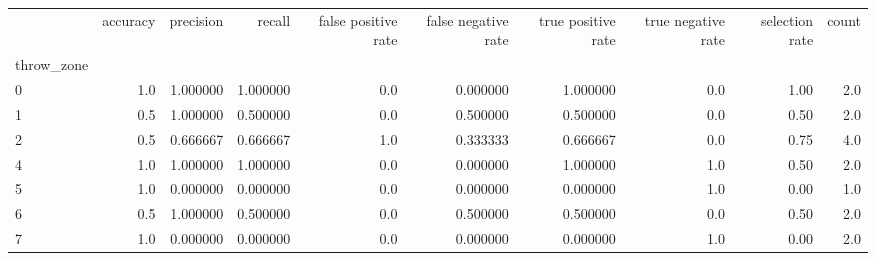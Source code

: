 \begin{tabular}{lrrrrrrrrr}
\toprule
{} &  accuracy &  precision &    recall &  false positive rate &  false negative rate &  true positive rate &  true negative rate &  selection rate &  count \\
throw\_zone &           &            &           &                      &                      &                     &                     &                 &        \\
\midrule
0          &       1.0 &   1.000000 &  1.000000 &                  0.0 &             0.000000 &            1.000000 &                 0.0 &            1.00 &    2.0 \\
1          &       0.5 &   1.000000 &  0.500000 &                  0.0 &             0.500000 &            0.500000 &                 0.0 &            0.50 &    2.0 \\
2          &       0.5 &   0.666667 &  0.666667 &                  1.0 &             0.333333 &            0.666667 &                 0.0 &            0.75 &    4.0 \\
4          &       1.0 &   1.000000 &  1.000000 &                  0.0 &             0.000000 &            1.000000 &                 1.0 &            0.50 &    2.0 \\
5          &       1.0 &   0.000000 &  0.000000 &                  0.0 &             0.000000 &            0.000000 &                 1.0 &            0.00 &    1.0 \\
6          &       0.5 &   1.000000 &  0.500000 &                  0.0 &             0.500000 &            0.500000 &                 0.0 &            0.50 &    2.0 \\
7          &       1.0 &   0.000000 &  0.000000 &                  0.0 &             0.000000 &            0.000000 &                 1.0 &            0.00 &    2.0 \\
\bottomrule
\end{tabular}
